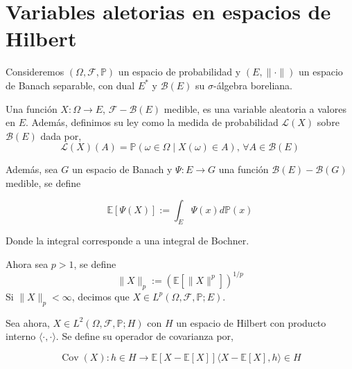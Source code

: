 \section{Variables aletorias en espacios de Hilbert}

Consideremos $(\Omega, \mathcal{F}, \mathbb{P})$ un espacio de probabilidad y $(E, \|\cdot \|)$ un espacio de Banach separable, con dual $E^*$ y $\mathcal{B}(E)$ su $\sigma$-álgebra boreliana.

Una función $X: \Omega \rightarrow E$, $\mathcal{F}-\mathcal{B}(E)$ medible, es una variable aleatoria a valores en $E$. Además, definimos su ley como la medida de probabilidad $\mathcal{L}(X)$ sobre $\mathcal{B}(E)$ dada por,
$$
\mathcal{L}(X)(A) = \mathbb{P}(\omega \in \Omega \mid X(\omega) \in A),\, \forall A \in \mathcal{B}(E)
$$

Además, sea $G$ un espacio de Banach y $\Psi: E \rightarrow G$ una función $\mathcal{B}(E)-\mathcal{B}(G)$ medible, se define

$$
\mathbb{E}[\Psi(X)] := \int_E \Psi(x) d \mathbb{P}(x)
$$

Donde la integral corresponde a una integral de Bochner.

Ahora sea $p > 1$, se define
$$
\| X \|_p := (\mathbb{E}[\|X\|^p])^{1/p}
$$
Si $\|X\|_p < \infty$, decimos que $X \in L^p(\Omega, \mathcal{F}, \mathbb{P};  E)$.

Sea ahora, $X \in L^2(\Omega, \mathcal{F}, \mathbb{P}; H)$ con $H$ un espacio de Hilbert con producto interno $\langle \cdot, \cdot \rangle$. Se define su operador de covarianza por,

$$
\operatorname{Cov}(X): h \in H \rightarrow \mathbb{E}[X - \mathbb{E}[X]]\langle X - \mathbb{E}[X], h \rangle \in H
$$

